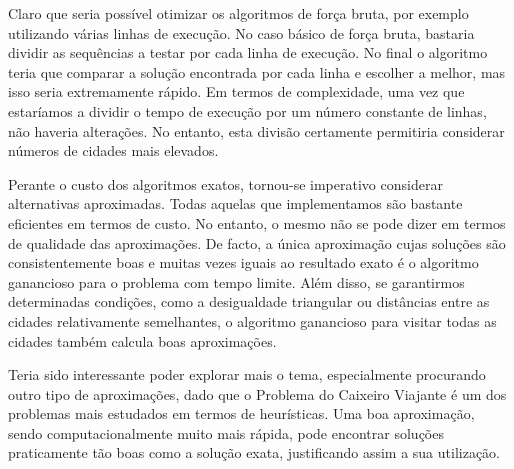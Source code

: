 \documentclass[12pt,a4paper,reqno]{report}
\numberwithin{equation}{section}
\begin{document}
Claro que seria possível otimizar os algoritmos de força bruta, por exemplo utilizando várias linhas de execução. No caso básico de força bruta, bastaria dividir as sequências a testar por cada linha de execução. No final o algoritmo teria que comparar a solução encontrada por cada linha e escolher a melhor, mas isso seria extremamente rápido. Em termos de complexidade, uma vez que estaríamos a dividir o tempo de execução por um número constante de linhas, não haveria alterações. No entanto, esta divisão certamente permitiria considerar números de cidades mais elevados.

Perante o custo dos algoritmos exatos, tornou-se imperativo considerar alternativas aproximadas. Todas aquelas que implementamos são bastante eficientes em termos de custo. No entanto, o mesmo não se pode dizer em termos de qualidade das aproximações. De facto, a única aproximação cujas soluções são consistentemente boas e muitas vezes iguais ao resultado exato é o algoritmo ganancioso para o problema com tempo limite. Além disso, se garantirmos determinadas condições, como a desigualdade triangular ou distâncias entre as cidades relativamente semelhantes, o algoritmo ganancioso para visitar todas as cidades também calcula boas aproximações.

Teria sido interessante poder explorar mais o tema, especialmente procurando outro tipo de aproximações, dado que o Problema do Caixeiro Viajante é um dos problemas mais estudados em termos de heurísticas. Uma boa aproximação, sendo computacionalmente muito mais rápida, pode encontrar soluções praticamente tão boas como a solução exata, justificando assim a sua utilização.



\end{document}
